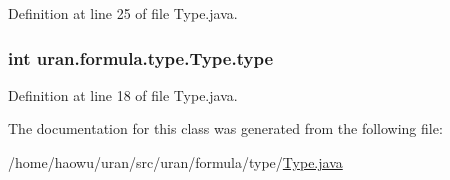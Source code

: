 Definition at line 25 of file Type.\+java.

\hypertarget{classuran_1_1formula_1_1type_1_1_type_a94d6f5842ebc886ea16f96232a003b1c}{}
\subsubsection[{type}]{\setlength{\rightskip}{0pt plus 5cm}int uran.\+formula.\+type.\+Type.\+type\hspace{0.3cm}{\ttfamily [protected]}}\label{classuran_1_1formula_1_1type_1_1_type_a94d6f5842ebc886ea16f96232a003b1c}


Definition at line 18 of file Type.\+java.



The documentation for this class was generated from the following file\+:\begin{DoxyCompactItemize}
\item 
/home/haowu/uran/src/uran/formula/type/\hyperlink{_type_8java}{Type.\+java}\end{DoxyCompactItemize}
